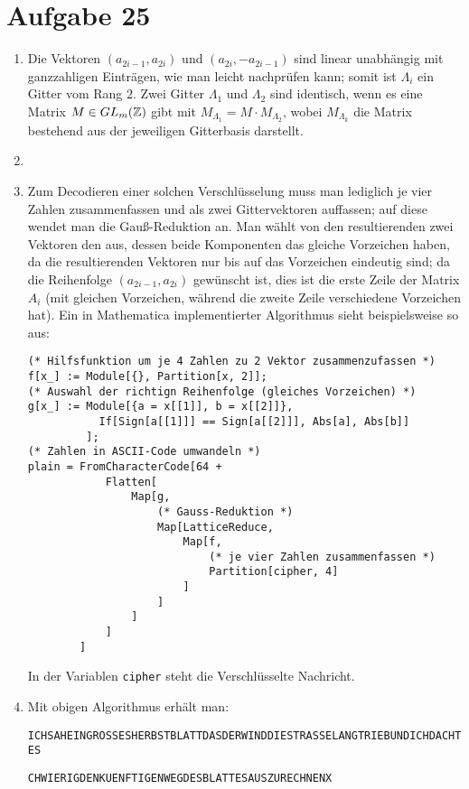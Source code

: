 \section*{Aufgabe 25}
\begin{enumerate}[(1)]
	\item Die Vektoren $(a_{2 i - 1}, a_{2 i})$ und $(a_{2 i},-a_{2 i -
	1})$ sind linear unabhängig mit ganzzahligen Einträgen, wie man leicht
	nachprüfen kann; somit ist $\Lambda_i$ ein Gitter vom Rang $2$. Zwei
	Gitter $\Lambda_1$ und $\Lambda_2$ sind identisch, wenn es eine Matrix
	$M \in GL_m(\mathbb{Z})$ gibt mit $M_{\Lambda_1} = M \cdot M_{\Lambda_2}$, wobei
	$M_{\Lambda_k}$ die Matrix bestehend aus der jeweiligen Gitterbasis
	darstellt.
	\item 
	\item Zum Decodieren einer solchen Verschlüsselung muss man lediglich
	je vier Zahlen zusammenfassen und als zwei Gittervektoren auffassen;
	auf diese wendet man die Gauß-Reduktion an. Man wählt von den
	resultierenden zwei Vektoren den aus, dessen beide Komponenten das
	gleiche Vorzeichen haben, da die resultierenden Vektoren nur bis auf
	das Vorzeichen eindeutig sind; da die Reihenfolge $(a_{2i-1}, a_{2i})$
	gewünscht ist, dies ist die erste Zeile der Matrix $A_i$ (mit gleichen
	Vorzeichen, während die zweite Zeile verschiedene Vorzeichen hat).
	Ein in Mathematica implementierter Algorithmus sieht beispielsweise so aus:
\begin{lstlisting}
(* Hilfsfunktion um je 4 Zahlen zu 2 Vektor zusammenzufassen *)
f[x_] := Module[{}, Partition[x, 2]];
(* Auswahl der richtign Reihenfolge (gleiches Vorzeichen) *)
g[x_] := Module[{a = x[[1]], b = x[[2]]}, 
           If[Sign[a[[1]]] == Sign[a[[2]]], Abs[a], Abs[b]]
         ];
(* Zahlen in ASCII-Code umwandeln *)
plain = FromCharacterCode[64 +
            Flatten[
                Map[g, 
                    (* Gauss-Reduktion *)
                    Map[LatticeReduce, 
                        Map[f,
                            (* je vier Zahlen zusammenfassen *)
                            Partition[cipher, 4]
                        ]
                    ]
                ]
            ]
        ]
\end{lstlisting}
	In der Variablen \verb/cipher/ steht die Verschlüsselte Nachricht.
	\item Mit obigen Algorithmus erhält man:

	\verb/ICHSAHEINGROSSESHERBSTBLATTDASDERWINDDIESTRASSELANGTRIEBUNDICHDACHTES/

	\verb/CHWIERIGDENKUENFTIGENWEGDESBLATTESAUSZURECHNENX/
\end{enumerate}
